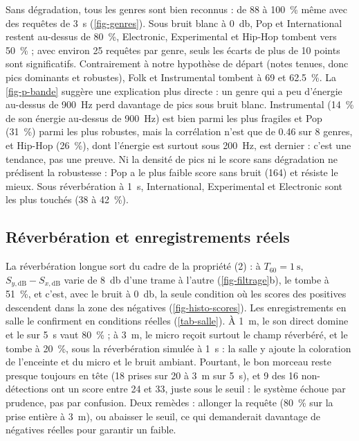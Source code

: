 Sans dégradation, tous les genres sont bien reconnus : de 88 à \qty{100}{\percent} même avec
des requêtes de \qty{3}{\second} (\cref{fig-genres}). Sous bruit blanc à \qty{0}{\decibel},
Pop et International restent au-dessus de \qty{80}{\percent}, Electronic, Experimental et
Hip-Hop tombent vers \qty{50}{\percent} ; avec environ 25 requêtes par genre, seuls les écarts
de plus de 10 points sont significatifs. Contrairement à notre hypothèse de départ (notes
tenues, donc pics dominants et robustes), Folk et Instrumental tombent à 69 et
\qty{62.5}{\percent}. La \cref{fig-p-bande} suggère une explication plus directe : un genre
qui a peu d'énergie au-dessus de \qty{900}{\hertz} perd davantage de pics sous bruit blanc.
Instrumental (\qty{14}{\percent} de son énergie au-dessus de \qty{900}{\hertz}) est bien parmi
les plus fragiles et Pop (\qty{31}{\percent}) parmi les plus robustes, mais la corrélation n'est
que de \num{0.46} sur 8 genres, et Hip-Hop (\qty{26}{\percent}), dont l'énergie est surtout sous
\qty{200}{\hertz}, est dernier : c'est une tendance, pas une preuve. Ni la densité de pics ni
le score sans dégradation ne prédisent la robustesse : Pop a le plus faible score sans bruit
(164) et résiste le mieux. Sous réverbération à \qty{1}{\second}, International, Experimental
et Electronic sont les plus touchés (38 à \qty{42}{\percent}).

\subsection{Réverbération et enregistrements réels}
\label{sec-echecs-reverb}

La réverbération longue sort du cadre de la propriété (2) : à $T_{60} = \qty{1}{\second}$,
$S_{y,\mathrm{dB}} - S_{x,\mathrm{dB}}$ varie de \qty{8}{\decibel} d'une trame à l'autre
(\cref{fig-filtrage}b), le \TBD{} tombe à \qty{51}{\percent}, et c'est, avec le bruit à
\qty{0}{\decibel}, la seule condition où les scores des positives descendent dans la zone
des négatives (\cref{fig-histo-scores}). Les enregistrements en salle le confirment en
conditions réelles (\cref{tab-salle}). À \qty{1}{\metre}, le son direct domine et le \TBD{} sur
\qty{5}{\second} vaut \qty{80}{\percent} ; à \qty{3}{\metre}, le micro reçoit surtout le champ
réverbéré, et le \TBD{} tombe à \qty{20}{\percent}, sous la réverbération simulée à
\qty{1}{\second} : la salle y ajoute la coloration de l'enceinte et du micro et le bruit
ambiant. Pourtant, le bon
morceau reste presque toujours en tête (18 prises sur 20 à \qty{3}{\metre} sur
\qty{5}{\second}), et 9 des 16 non-détections ont un score entre 24 et 33, juste sous le
seuil : le système échoue par prudence, pas par confusion. Deux remèdes : allonger la
requête (\qty{80}{\percent} sur la prise entière à \qty{3}{\metre}), ou abaisser le seuil, ce
qui demanderait davantage de négatives réelles pour garantir un \TFD{} faible.

